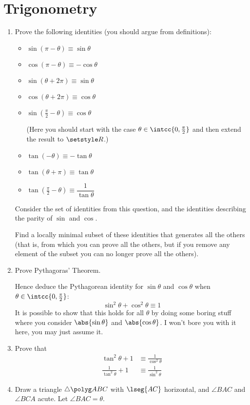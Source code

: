 \section{Trigonometry}

\begin{enumerate}
 \item
  Prove the following identities (you should argue from definitions):
  \begin{itemize}
   \item
    \(\sin(\pi - \theta) \equiv \sin \theta\)
   \item
    \(\cos(\pi - \theta) \equiv - \cos \theta\)
   \item
    \(\sin(\theta + 2\pi) \equiv \sin \theta\)
   \item
    \(\cos(\theta + 2\pi) \equiv \cos \theta\)
   \item
    \(\sin(\frac \pi 2 - \theta) \equiv \cos \theta\)

    (Here you should start with the case \(\theta \in \intcc{0, \frac \pi 2}\)
    and then extend the result to \(\Reals\).)
   \item
    \(\tan(-\theta) \equiv -\tan \theta\)
   \item
    \(\tan(\theta + \pi) \equiv \tan \theta\)
   \item
    \(\tan(\frac \pi 2 - \theta) \equiv \dfrac 1{\tan \theta}\)
  \end{itemize}
  Consider the set of identities from this question, and the identities
  describing the parity of \(\sin\) and \(\cos\).

  Find a locally minimal subset of these identities that generates all the
  others (that is, from which you can prove all the others, but if you remove
  any element of the subset you can no longer prove all the others).
 \item
  Prove Pythagoras' Theorem.

  Hence deduce the Pythagorean identity for \(\sin \theta\) and \(\cos \theta\)
  when \(\theta \in \intcc{0, \frac \pi 2}\):
  \begin{equation*}
   \sin^2 \theta + \cos^2 \theta \equiv 1
  \end{equation*}
  It is possible to show that this holds for all \(\theta\) by doing some boring
  stuff where you consider \(\abs{\sin \theta}\) and \(\abs{\cos \theta}\). I
  won't bore you with it here, you may just assume it.
 \item
  Prove that
  \begin{align*}
   \tan^2 \theta + 1 &\equiv \frac 1{\cos^2 \theta} \\
   \frac 1{\tan^2 \theta} + 1 &\equiv \frac 1{\sin^2 \theta}
  \end{align*}
 \item
  Draw a triangle \(\tri{ABC}\) with \(\lseg{AC}\) horizontal, and
  \(\angle{BAC}\) and \(\angle{BCA}\) acute. Let \(\angle{BAC} = \theta\).


\end{enumerate}
